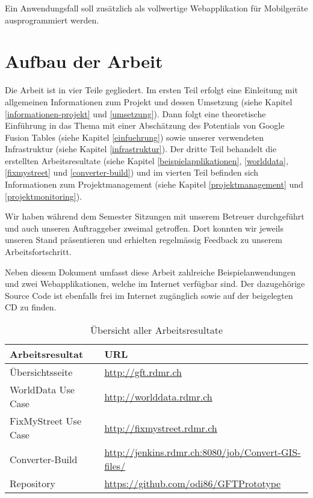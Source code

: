 Ein Anwendungsfall soll zusätzlich als vollwertige Webapplikation für Mobilgeräte ausprogrammiert werden.

\section{Aufbau der Arbeit}
Die Arbeit ist in vier Teile gegliedert. Im ersten Teil erfolgt eine Einleitung mit allgemeinen Informationen zum Projekt und dessen Umsetzung (siehe Kapitel \ref{informationen-projekt} und \ref{umsetzung}). Dann folgt eine theoretische Einführung in das Thema mit einer Abschätzung des Potentials von Google Fusion Tables (siehe Kapitel \ref{einfuehrung}) sowie unserer verwendeten Infrastruktur (siehe Kapitel \ref{infrastruktur}). Der dritte Teil behandelt die erstellten Arbeitsresultate (siehe Kapitel \ref{beispielapplikationen}, \ref{worlddata}, \ref{fixmystreet} und \ref{converter-build}) und im vierten Teil befinden sich Informationen zum Projektmanagement (siehe Kapitel \ref{projektmanagement} und \ref{projektmonitoring}).

Wir haben während dem Semester Sitzungen mit unserem Betreuer durchgeführt und auch unseren Auftraggeber zweimal getroffen. Dort konnten wir jeweils unseren Stand präsentieren und erhielten regelmässig Feedback zu unserem Arbeitsfortschritt.

Neben diesem Dokument umfasst diese Arbeit zahlreiche Beispielanwendungen und zwei Webapplikationen, welche im Internet verfügbar sind. Der dazugehörige Source Code ist ebenfalls frei im Internet zugänglich sowie auf der beigelegten CD zu finden.

\begin{table}[H]
\centering
\begin{tabular}{|p{0.3\twocelltabwidth}|p{0.7\twocelltabwidth}|}
\hline 
\textbf{Arbeitsresultat} & \textbf{URL} \\ 
\hline 
Übersichtsseite & \url{http://gft.rdmr.ch} \\ 
\hline 
WorldData Use Case & \url{http://worlddata.rdmr.ch} \\ 
\hline 
FixMyStreet Use Case & \url{http://fixmystreet.rdmr.ch} \\ 
\hline 
Converter-Build & \url{http://jenkins.rdmr.ch:8080/job/Convert-GIS-files/} \\ 
\hline 
Repository & \url{https://github.com/odi86/GFTPrototype} \\ 
\hline 
\end{tabular}
\label{arbeitsresultate}
\caption{Übersicht aller Arbeitsresultate}
\end{table} 